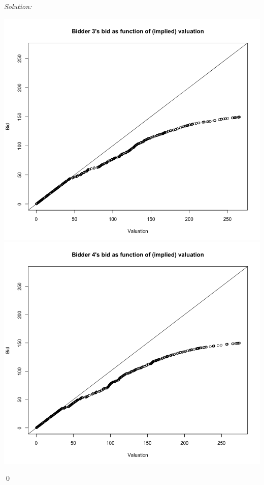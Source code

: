 \documentclass[12pt]{article}
\newenvironment{problem}[2][Problem]{\begin{trivlist}
\item[\hskip \labelsep {\bfseries #1}\hskip \labelsep {\bfseries #2.}]}{\end{trivlist}}
\newenvironment{sol}
    {\emph{Solution:}
    }
    {
    \qed
    }
\begin{document}
\begin{sol}
\begin{center}
        \includegraphics[scale=0.25]{Bid_3.png} \includegraphics[scale=0.25]{Bid_4.png}
    \end{center}
\end{sol}
\begin{problem}{2}
\end{problem}
\end{document}
